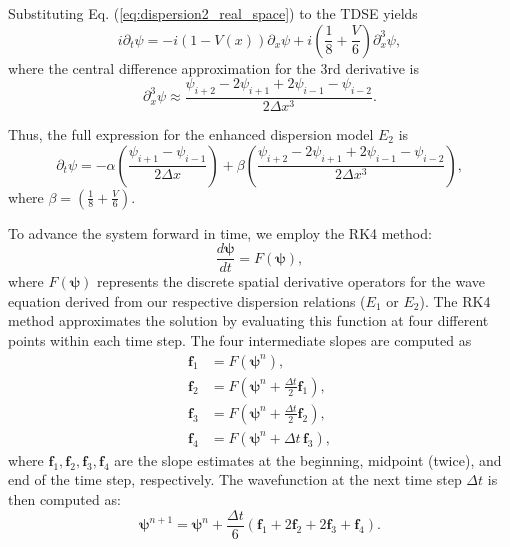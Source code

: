 \documentclass[%
 aip,
 amsmath,amssymb,
 reprint,%
]{revtex4-1}
\begin{document}
Substituting Eq. (\ref{eq:dispersion2_real_space}) to the TDSE yields
\begin{equation}
i \partial_t \psi = -i (1-V(x)) \partial_x \psi + i  \left(\frac{1}{8} + \frac{V}{6}\right)\partial^3_x \psi,
\end{equation}
where the central difference approximation for the 3rd derivative is
\begin{equation}
\partial^3_x \psi \approx \frac{\psi_{i+2} - 2 \psi_{i+1} + 2 \psi_{i-1} - \psi_{i-2}} {2 \Delta x^3}.
\end{equation}

Thus, the full expression for the enhanced dispersion model $E_2$ is
\begin{equation}
\partial_t \psi =  -\alpha \left(\frac{\psi_{i+1} - \psi_{i-1}}{2 \Delta x} \right) + \beta  \left(\frac{\psi_{i+2} - 2\psi_{i+1 } + 2\psi_{i-1} - \psi_{i-2}}{2 \Delta x^3} \right),
\end{equation}
where $\beta= \left(\frac{1}{8} + \frac{V}{6} \right)$.

To advance the system forward in time, we employ the RK4 method:
\begin{equation}
\frac{d\boldsymbol{\psi}}{dt} = F(\boldsymbol{\psi}),
\end{equation}
where $F(\boldsymbol{\psi})$ represents the discrete spatial derivative operators for the wave equation derived from our respective dispersion relations ($E_1$ or $E_2$). The RK4 method approximates the solution by evaluating this function at four different points within each time step. The four intermediate slopes are computed as
\begin{align}
\mathbf{f}_1 &= F(\boldsymbol{\psi}^n), \\[6pt]
\mathbf{f}_2 &= F\left(\boldsymbol{\psi}^n + \tfrac{\Delta t}{2}\mathbf{f}_1 \right), \\[6pt]
\mathbf{f}_3 &= F\left(\boldsymbol{\psi}^n + \tfrac{\Delta t}{2}\mathbf{f}_2 \right), \\[6pt]
\mathbf{f}_4 &= F\left(\boldsymbol{\psi}^n + \Delta t\, \mathbf{f}_3 \right),
\end{align}
where $\mathbf{f}_1, \mathbf{f}_2, \mathbf{f}_3, \mathbf{f}_4$ are the slope estimates at the beginning, midpoint (twice), and end of the time step, respectively. The wavefunction at the next time step $\Delta t$ is then computed as:
\begin{equation}
\boldsymbol{\psi}^{n+1} = \boldsymbol{\psi}^n + \frac{\Delta t}{6}\left(\mathbf{f}_1 + 2\mathbf{f}_2 + 2\mathbf{f}_3 + \mathbf{f}_4\right).
\end{equation}
\end{document}
